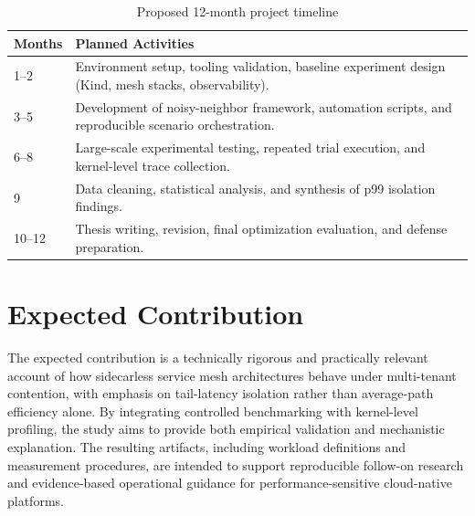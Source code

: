 \documentclass[12pt,a4paper]{article}
\begin{document}
\begin{table}[h]
  \centering
  \caption{Proposed 12-month project timeline}
  \label{tab:timeline}
  \begin{tabular}{@{}ll@{}}
    \toprule
    \textbf{Months} & \textbf{Planned Activities} \\
    \midrule
    1--2 & Environment setup, tooling validation, baseline experiment design (Kind, mesh stacks, observability). \\
    3--5 & Development of noisy-neighbor framework, automation scripts, and reproducible scenario orchestration. \\
    6--8 & Large-scale experimental testing, repeated trial execution, and kernel-level trace collection. \\
    9 & Data cleaning, statistical analysis, and synthesis of p99 isolation findings. \\
    10--12 & Thesis writing, revision, final optimization evaluation, and defense preparation. \\
    \bottomrule
  \end{tabular}
\end{table}

\section{Expected Contribution}
The expected contribution is a technically rigorous and practically relevant account of how sidecarless service mesh architectures behave under multi-tenant contention, with emphasis on tail-latency isolation rather than average-path efficiency alone. By integrating controlled benchmarking with kernel-level profiling, the study aims to provide both empirical validation and mechanistic explanation. The resulting artifacts, including workload definitions and measurement procedures, are intended to support reproducible follow-on research and evidence-based operational guidance for performance-sensitive cloud-native platforms.

\printbibliography
\end{document}

